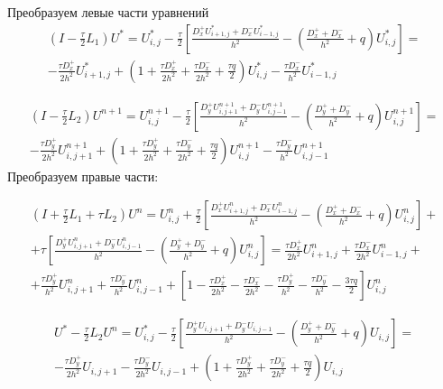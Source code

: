 \documentclass[a4paper,12pt]{article}
\begin{document}
Преобразуем левые части уравнений
\begin{multline*}
      \left( I - \frac{\tau}{2} L_1 \right) U^* = U^*_{i,j} - \frac{\tau}{2} \left[ \frac{D^+_x U^*_{i+1,j} + D^-_x U^*_{i-1,j}}{h^2} - \left(\frac{D^+_x + D^-_x}{h^2} + q \right) U^*_{i,j} \right] = \\
    - \frac{\tau D^+_x }{2 h^2} U^*_{i+1,j} + \left(1 + \frac{\tau D^+_x}{2h^2} + \frac{\tau D^-_x}{2 h^2} + \frac{\tau q}{2} \right) U^*_{i,j} - \frac{\tau D^-_x}{h^2} U^*_{i-1,j}
\end{multline*}

\begin{multline*}
        \left( I - \frac{\tau}{2} L_2 \right) U^{n+1} = U^{n+1}_{i,j} - \frac{\tau}{2} \left[ \frac{D^+_y U^{n+1}_{i,j+1} + D^-_y U^{n+1}_{i,j-1}}{h^2} - \left(\frac{D^+_y + D^-_y}{h^2} + q \right) U^{n+1}_{i,j} \right] = \\
    - \frac{\tau D^+_y }{2 h^2} U^{n+1}_{i,j+1} + \left(1 + \frac{\tau D^+_y}{2h^2} + \frac{\tau D^-_y}{2 h^2} + \frac{\tau q}{2} \right) U^{n+1}_{i,j} - \frac{\tau D^-_y}{h^2} U^{n+1}_{i,j-1}
\end{multline*}
Преобразуем правые части:

\begin{multline*}
  \left( I + \frac{\tau}{2} L_1 + \tau L_2 \right) U^n = U^n_{i,j} + \frac{\tau}{2} \left[ \frac{D^+_x U^n_{i+1,j} + D^-_x U^n_{i-1,j}}{h^2} - \left(\frac{D^+_x + D^-_x}{h^2} + q \right) U^n_{i,j} \right] + \\  + \tau \left[ \frac{D^+_y U^n_{i,j+1} + D^-_y U^n_{i,j-1}}{h^2} - \left(\frac{D^+_y + D^-_y}{h^2} + q \right) U^n_{i,j} \right] 
= \frac{\tau D^+_x}{2 h^2} U^n_{i+1,j} + \frac{\tau D^-_x}{2 h^2} U^n_{i-1,j} + \\ + \frac{\tau D^+_y}{h^2} U^n_{i,j+1} + \frac{\tau D^-_y}{h^2} U^n_{i,j-1} + \left[ 1 - \frac{\tau D^+_x}{2h^2} - \frac{\tau D^-_x}{2h^2} - \frac{ \tau D^+_y}{h^2} - \frac{\tau D^-_y}{h^2} - \frac{3 \tau q}{2} \right] U^n_{i,j}
\end{multline*}


\begin{multline*}
  U^* - \frac{\tau}{2} L_2 U^n = U_{i,j}^* - \frac{\tau}{2} \left[ \frac{D^+_y U_{i,j+1} + D^-_y U_{i,j-1}}{h^2} - \left(\frac{D^+_y + D^-_y}{h^2} + q \right) U_{i,j} \right] = \\ 
- \frac{\tau D^+_y}{2 h^2} U_{i,j+1} - \frac{\tau D^-_y}{2 h^2} U_{i,j-1} + \left( 1 + \frac{\tau D^+_y}{2 h^2} + \frac{\tau D^-_y}{2 h^2} + \frac{\tau q}{2} \right) U_{i,j}
\end{multline*}
\end{document}
